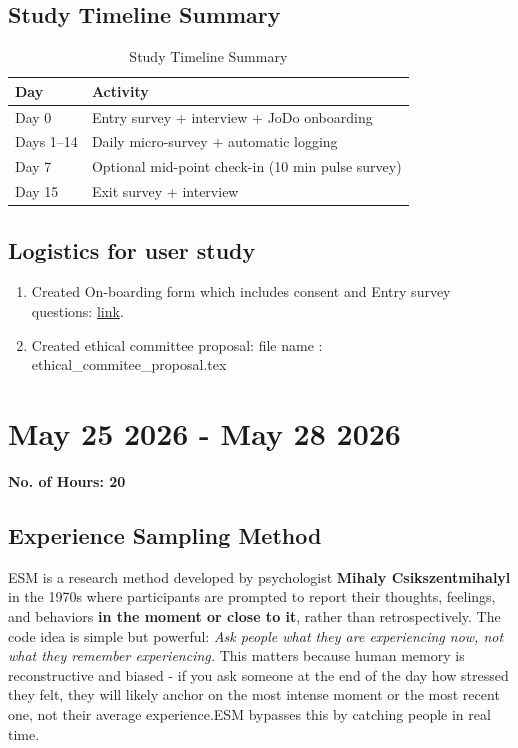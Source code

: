 \documentclass[12pt]{article}
\begin{document}
\subsection{Study Timeline Summary
}
\begin{table}[h]
\centering
\caption{Study Timeline Summary}
\label{tab:study-timeline}
\begin{tabular}{|l|l|}
\hline
\textbf{Day} & \textbf{Activity} \\
\hline
Day 0 & Entry survey + interview + JoDo onboarding \\
\hline
Days 1--14 & Daily micro-survey + automatic logging \\
\hline
Day 7 & Optional mid-point check-in (10 min pulse survey) \\
\hline
Day 15 & Exit survey + interview \\
\hline
\end{tabular}
\end{table}

\subsection{Logistics for user study}
\begin{enumerate}
    \item Created On-boarding form which includes consent and Entry survey questions: \href{https://forms.gle/3uZ9fVCiFv3HCYja7}{link}.
    \item Created ethical committee proposal: file name : ethical\_commitee\_proposal.tex
\end{enumerate}

\section{May 25 2026  - May 28 2026}
{\bf No. of Hours: 20}
\subsection{Experience Sampling Method}
ESM is a research method developed by psychologist \textbf{Mihaly Csikszentmihalyl} in the 1970s where participants are prompted to report their thoughts, feelings, and behaviors \textbf{in the moment or close to it}, rather than retrospectively. The code idea is simple but powerful:
\newline
\textit{Ask people what they are experiencing now, not what they remember experiencing.}
\newline
This matters because human memory is reconstructive and biased - if you ask someone at the end of the day how stressed they felt, they will likely anchor on the most intense moment or the most recent one, not their average experience.ESM bypasses this by catching people in real time.
\end{document}

